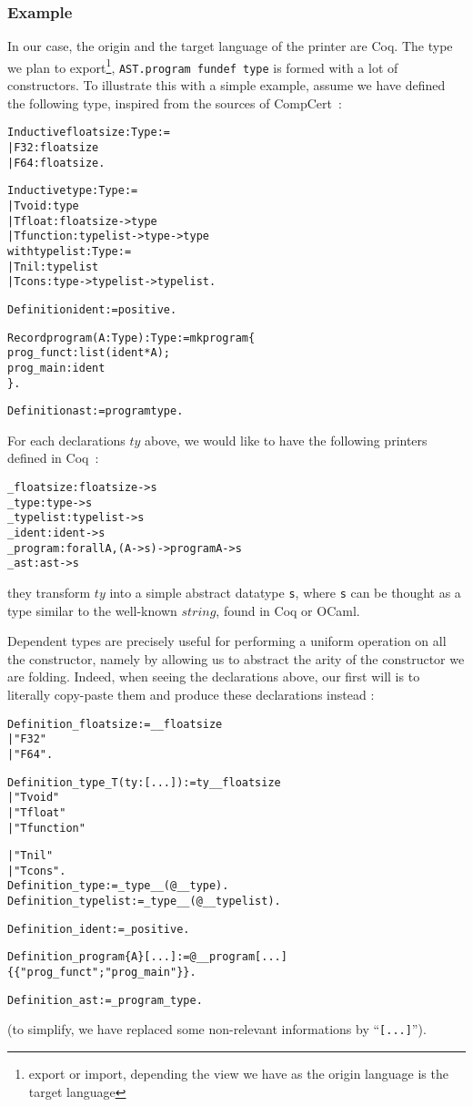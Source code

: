 \documentclass[a4paper, 11pt]{article}
\newenvironment{coq}
  {%
   \begin{alltt}} %% 8.3pl1 (January 2011)
  {\end{alltt} %
  }
\begin{document}
\subsubsection{Example}
In our case, the origin and the target language of the printer are Coq. The type we plan to export\footnote{export or import, depending the view we have as the origin language is the target language}, \verb|AST.program fundef type| is formed with a lot of constructors. To illustrate this with a simple example, assume we have defined the following type, inspired from the sources of CompCert~:
\begin{coq}
Inductive floatsize : Type :=
  | F32: floatsize
  | F64: floatsize.

Inductive type : Type :=
  | Tvoid : type
  | Tfloat: floatsize -> type
  | Tfunction: typelist -> type -> type
with typelist : Type :=
  | Tnil : typelist
  | Tcons : type -> typelist -> typelist.

Definition ident := positive.

Record program (A : Type) : Type := mkprogram \{
  prog_funct : list (ident * A);
  prog_main : ident
\}.

Definition ast := program type.
\end{coq}
For each declarations $ty$ above, we would like to have the following printers defined in Coq~:
\begin{coq}
_floatsize : floatsize -> s
_type : type -> s
_typelist : typelist -> s
_ident : ident -> s
_program : forall A, (A -> s) -> program A -> s
_ast : ast -> s
\end{coq}
they transform $ty$ into a simple abstract datatype \verb|s|, where \verb|s| can be thought as a type similar to the well-known $string$, found in Coq or OCaml.

Dependent types are precisely useful for performing a uniform operation on all the constructor, namely by allowing us to abstract the arity of the constructor we are folding. Indeed, when seeing the declarations above, our first will is to literally copy-paste them and produce these declarations instead :
\begin{coq}
Definition _floatsize := __floatsize 
  | "F32" 
  | "F64".

Definition _type_ T (ty : [...]) := ty _ _floatsize
  | "Tvoid"
  | "Tfloat"
  | "Tfunction"

  | "Tnil"
  | "Tcons".
  Definition _type := _type_ _ (@__type).
  Definition _typelist := _type_ _ (@__typelist).

Definition _ident := _positive.

Definition _program \{A\} [...] := @__program [...]
  \{\{ "prog_funct" ; "prog_main" \}\}.

Definition _ast := _program _type.
\end{coq}
(to simplify, we have replaced some non-relevant informations by ``\verb|[...]|'').
\end{document}
